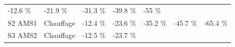 \documentclass[]{article}
\begin{document}
\begin{longtable}[]{@{}lllllll@{}}
\begin{minipage}[t]{0.11\columnwidth}
-12.6 \%\strut
\end{minipage} & \begin{minipage}[t]{0.11\columnwidth}\raggedright\strut
-21.9 \%\strut
\end{minipage} & \begin{minipage}[t]{0.11\columnwidth}\raggedright\strut
-31.3 \%\strut
\end{minipage} & \begin{minipage}[t]{0.11\columnwidth}\raggedright\strut
-39.8 \%\strut
\end{minipage} & \begin{minipage}[t]{0.11\columnwidth}\raggedright\strut
-55 \%\strut
\end{minipage}\tabularnewline
\begin{minipage}[t]{0.14\columnwidth}\raggedright\strut
S2 AMS1\strut
\end{minipage} & \begin{minipage}[t]{0.13\columnwidth}\raggedright\strut
Chauffage\strut
\end{minipage} & \begin{minipage}[t]{0.11\columnwidth}\raggedright\strut
-12.4 \%\strut
\end{minipage} & \begin{minipage}[t]{0.11\columnwidth}\raggedright\strut
-23.6 \%\strut
\end{minipage} & \begin{minipage}[t]{0.11\columnwidth}\raggedright\strut
-35.2 \%\strut
\end{minipage} & \begin{minipage}[t]{0.11\columnwidth}\raggedright\strut
-45.7 \%\strut
\end{minipage} & \begin{minipage}[t]{0.11\columnwidth}\raggedright\strut
-65.4 \%\strut
\end{minipage}\tabularnewline
\begin{minipage}[t]{0.14\columnwidth}\raggedright\strut
S3 AMS2\strut
\end{minipage} & \begin{minipage}[t]{0.13\columnwidth}\raggedright\strut
Chauffage\strut
\end{minipage} & \begin{minipage}[t]{0.11\columnwidth}\raggedright\strut
-12.5 \%\strut
\end{minipage} & \begin{minipage}[t]{0.11\columnwidth}\raggedright\strut
-23.7 \%\strut
\end{minipage} & \begin{minipage}[t]{0.11\columnwidth}\raggedright\strut

\end{minipage}
\end{longtable}
\end{document}
